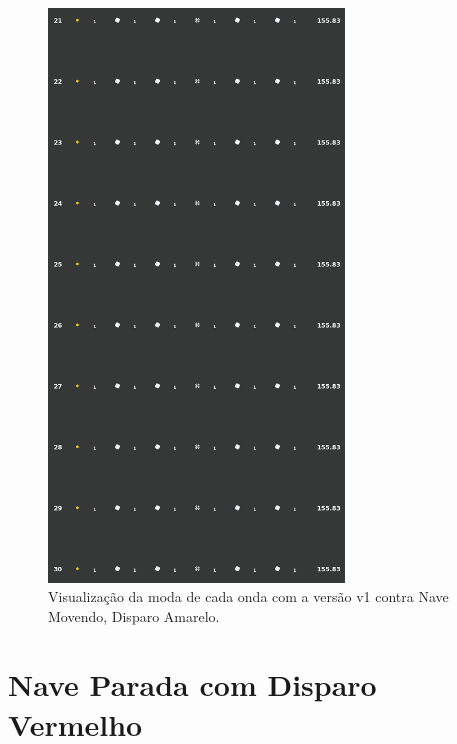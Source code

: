 \begin{figure}[H]
  \centering
  \includegraphics[width=0.7\textwidth]{figuras/ss/ss_yellowstill_ai_mode_1_3.png}
  \caption{Visualização da moda de cada onda com a versão v1 contra Nave Movendo, Disparo Amarelo.}
  \label{fig:ss-moda-ym-1-3}
\end{figure}

\section{Nave Parada com Disparo Vermelho}
\label{sec:apend-moda-ss-rs-v1}

